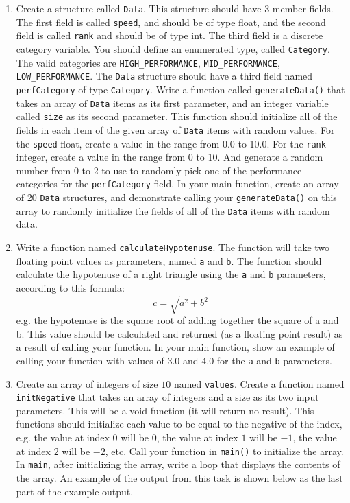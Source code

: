 \documentclass[11pt]{article}
\begin{document}
\begin{enumerate}
\item Create a structure called \verb~Data~.  This structure should have 3
   member fields.  The first field is called \verb~speed~, and should be of
   type float, and the second field is called \verb~rank~ and should be of
   type int.  The third field is a discrete category variable.  You
   should define an enumerated type, called \verb~Category~.  The valid
   categories are \verb~HIGH_PERFORMANCE~, \verb~MID_PERFORMANCE~,
   \verb~LOW_PERFORMANCE~.  The \verb~Data~ structure should have a third field
   named \verb~perfCategory~ of type \verb~Category~.  Write a function called
   \verb~generateData()~ that takes an array of \verb~Data~ items as its first
   parameter, and an integer variable called \verb~size~ as its second
   parameter.  This function should initialize all of the fields in
   each item of the given array of \verb~Data~ items with random values.
   For the \verb~speed~ float, create a value in the range from 0.0 to
   10.0.  For the \verb~rank~ integer, create a value in the range from 0
   to 10. And generate a random number from 0 to 2 to use to randomly
   pick one of the performance categories for the \verb~perfCategory~
   field.  In your main function, create an array of 20 \verb~Data~
   structures, and demonstrate calling your \verb~generateData()~ on this
   array to randomly initialize the fields of all of the \verb~Data~ items
   with random data.
\item Write a function named \verb~calculateHypotenuse~.  The function will
   take two floating point values as parameters, named \verb~a~ and \verb~b~.
   The function should calculate the hypotenuse of a right triangle
   using the \verb~a~ and \verb~b~ parameters, according to this formula: $$ c =
   \sqrt{a^2 + b^2} $$ e.g. the hypotenuse is the square root of
   adding together the square of a and b.  This value should be
   calculated and returned (as a floating point result) as a result of
   calling your function.  In your main function, show an example of
   calling your function with values of $3.0$ and $4.0$ for the \verb~a~
   and \verb~b~ parameters.
\item Create an array of integers of size $10$ named \verb~values~.  Create a
   function named \verb~initNegative~ that takes an array of integers and a
   size as its two input parameters.  This will be a void function (it
   will return no result).  This functions should initialize each
   value to be equal to the negative of the index, e.g. the value at
   index $0$ will be $0$, the value at index $1$ will be $-1$, the
   value at index $2$ will be $-2$, etc.  Call your function in
   \verb~main()~ to initialize the array.  In \verb~main~, after initializing
   the array, write a loop that displays the contents of the array.
   An example of the output from this task is shown below as the last
   part of the example output.
\end{enumerate}
\end{document}
